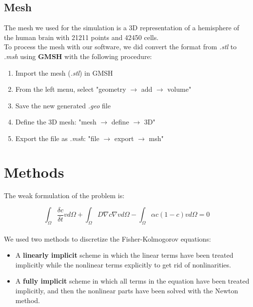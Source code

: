\documentclass[12pt, letterpaper]{article}
\begin{document}
\subsection{Mesh}
The mesh we used for the simulation is a 3D representation of a hemisphere of the human brain with 21211 points and 42450 cells.\\
To process the mesh with our software, we did convert the format from \textit{.stl} to \textit{.msh} using \textbf{GMSH} with the following procedure:
\begin{enumerate}
    \item Import the mesh (\textit{.stl}) in GMSH
    \item From the left menu, select "geometry $\rightarrow$ add $\rightarrow$ volume"
    \item Save the new generated \textit{.geo} file
    \item Define the 3D mesh: "mesh $\rightarrow$ define $\rightarrow$ 3D"
    \item Export the file as \textit{.msh}: "file $\rightarrow$ export $\rightarrow$ msh"
\end{enumerate}

\section{Methods}

The weak formulation of the problem is:

$$\int_\Omega\frac{\delta c}{\delta t}vd\Omega+\int_\Omega D\nabla c\nabla vd\Omega-\int_\Omega\alpha c(1-c)vd\Omega=0$$\\
We used two methods to discretize the Fisher-Kolmogorov equations:
\begin{itemize}
    \item A \textbf{linearly implicit} scheme in which the linear terms have been treated implicitly while the nonlinear terms explicitly to get rid of nonlinarities.
    \item A \textbf{fully implicit} scheme in which all terms in the equation have been treated implicitly, and then the nonlinear parts have been solved with the Newton method.
\end{itemize}

\end{document}
